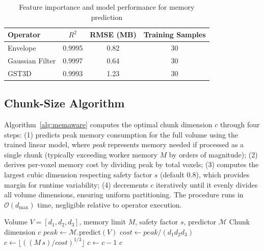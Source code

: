 \begin{table}[htb]
    \centering
    \caption{Feature importance and model performance for memory prediction}
    \label{tab:feature-importance}
    \begin{tabular}{lccc}
        \toprule
        \textbf{Operator} & \textbf{$R^2$} & \textbf{RMSE (MB)} & \textbf{Training Samples} \\
        \midrule
        Envelope & 0.9995 & 0.82 & 30 \\
        Gaussian Filter & 0.9997 & 0.64 & 30 \\
        \ac{GST3D} & 0.9993 & 1.23 & 30 \\
        \bottomrule
    \end{tabular}
\end{table}

\subsection{Chunk-Size Algorithm}

Algorithm~\ref{alg:memaware} computes the optimal chunk dimension $c$ through four steps:
(1) predicts peak memory consumption for the full volume using the trained linear model, where \textit{peak} represents memory needed if processed as a single chunk (typically exceeding worker memory $M$ by orders of magnitude);
(2) derives per-voxel memory cost by dividing peak by total voxels;
(3) computes the largest cubic dimension respecting safety factor $s$ (default 0.8), which provides margin for runtime variability;
(4) decrements $c$ iteratively until it evenly divides all volume dimensions, ensuring uniform partitioning.
The procedure runs in $\mathcal{O}(d_{\max})$ time, negligible relative to operator execution.

\begin{algorithm}[tb]
\caption{Memory-aware chunk sizing}
\label{alg:memaware}
\begin{algorithmic}[1]
\REQUIRE Volume $V=[d_1,d_2,d_3]$, memory limit $M$, safety factor $s$, predictor $\mathcal{M}$
\ENSURE Chunk dimension $c$
\STATE $\textit{peak}\leftarrow\mathcal{M}.\text{predict}(V)$ 
\STATE $\textit{cost}\leftarrow\textit{peak}/(d_1d_2d_3)$
\STATE $c\leftarrow\lfloor ((M\,s)/\textit{cost})^{1/3}\rfloor$
    \STATE $c\leftarrow c-1$
\ENDWHILE
\RETURN $c$
\end{algorithmic}
\end{algorithm}

